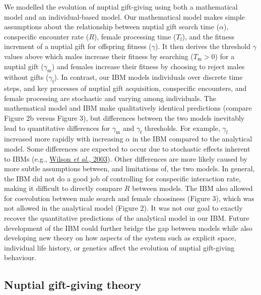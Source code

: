 \documentclass[
]{article}
\begin{document}
We modelled the evolution of nuptial gift-giving using both a
mathematical model and an individual-based model. Our mathematical model
makes simple assumptions about the relationship between nuptial gift
search time (\(\alpha\)), conspecific encounter rate (\(R\)), female
processing time (\(T_{\mathrm{f}}\)), and the fitness increment of a
nuptial gift for offspring fitness (\(\gamma\)). It then derives the
threshold \(\gamma\) values above which males increase their fitness by
searching (\(T_{\mathrm{m}} > 0\)) for a nuptial gift
(\(\gamma_{\mathrm{m}}\)) and females increase their fitness by choosing
to reject males without gifts (\(\gamma_{\mathrm{f}}\)). In contrast,
our IBM models individuals over discrete time steps, and key processes
of nuptial gift acquisition, conspecific encounters, and female
processing are stochastic and varying among individuals. The
mathematical model and IBM make qualitatively identical predictions
(compare Figure 2b versus Figure 3), but differences between the two
models inevitably lead to quantitative differences for
\(\gamma_{\mathrm{m}}\) and \(\gamma_{\mathrm{f}}\) thresholds. For
example, \(\gamma_{\mathrm{f}}\) increased more rapidly with increasing
\(\alpha\) in the IBM compared to the analytical model. Some differences
are expected to occur due to stochastic effects inherent to IBMs (e.g.,
\protect\hyperlink{ref-Wilson2003}{Wilson \emph{et al.}, 2003}). Other
differences are more likely caused by more subtle assumptions between,
and limitations of, the two models. In general, the IBM did not do a
good job of controlling for conspecific interaction rate, making it
difficult to directly compare \(R\) between models. The IBM also allowed
for coevolution between male search and female choosiness (Figure 3),
which was not allowed in the analytical model (Figure 2). It was not our
goal to exactly recover the quantitative predictions of the analytical
model in our IBM. Future development of the IBM could further bridge the
gap between models while also developing new theory on how aspects of
the system such as explicit space, individual life history, or genetics
affect the evolution of nuptial gift-giving behaviour.

\hypertarget{nuptial-gift-giving-theory}{%
\subsection{Nuptial gift-giving
theory}\label{nuptial-gift-giving-theory}}
\end{document}
